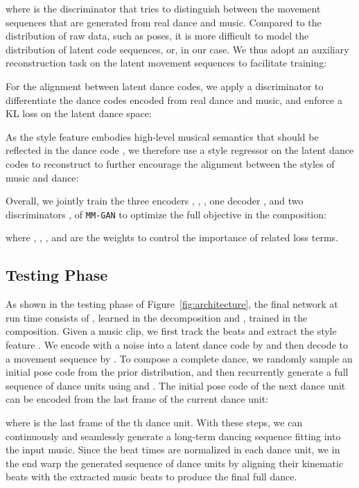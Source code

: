 \documentclass{article}
\newlength\secmargin
\newlength\subsecmargin
\newcommand{\figref}[1]{Figure~\ref{fig:#1}}
\begin{document}
where  is the discriminator that tries to distinguish between the movement sequences that are generated from real dance and music. 
Compared to the distribution of raw data, such as poses, it is more difficult to model the distribution of latent code sequences, or,  in our case. We thus adopt an auxiliary reconstruction task on the latent movement sequences to facilitate training: 

For the alignment between latent dance codes, we apply a discriminator  to differentiate the dance codes encoded from real dance and music, and enforce a KL loss on the latent dance space:

As the style feature  embodies high-level musical semantics that should be reflected in the dance code , we therefore use a style regressor  on the latent dance codes to reconstruct  to further encourage the alignment between the styles of music and dance:

Overall, we jointly train the three encoders , , , one decoder , and two discriminators ,  of \texttt{MM-GAN} to optimize the full objective in the composition: 

where ,  , , and
 are the weights to control the importance of related loss terms. 

\subsection{Testing Phase}
\label{subsec:test}
\vspace{\subsecmargin}
As shown in the testing phase of \figref{architecture}, the final network at run time consists of ,  learned in the decomposition and ,  trained in the composition. 
Given a music clip, we first track the beats and extract the style feature . 
We encode  with a noise  into a latent dance code  by  and then decode  to a movement sequence  by . 
To compose a complete dance, we randomly sample an initial pose code  from the prior distribution, and then recurrently generate a full sequence of dance units using  and . 
The initial pose code  of the next dance unit can be encoded from the last frame of the current dance unit:  

where  is the last frame of the th dance unit. 
With these steps, we can continuously and seamlessly generate a long-term dancing sequence fitting into the input music. 
Since the beat times are normalized in each dance unit, we in the end warp the generated sequence of dance units by aligning their kinematic beats with the extracted music beats  to produce the final full dance.
\end{document}
